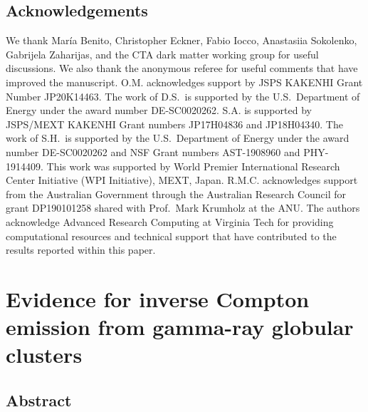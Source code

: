 \documentclass[doublespace,nopageskip]{VTthesis} %
\begin{document}


\section*{Acknowledgements}

We thank Mar\'ia Benito, Christopher Eckner, Fabio Iocco,  Anastasiia Sokolenko, Gabrijela Zaharijas, and the CTA dark matter working group for useful discussions. We also thank the anonymous referee for useful comments that have improved the manuscript. O.M. acknowledges support by JSPS KAKENHI Grant Number JP20K14463.  The work of D.S.\ is supported by the U.S.\ Department of Energy under the award number DE-SC0020262.
S.A. is supported by JSPS/MEXT KAKENHI Grant numbers JP17H04836 and JP18H04340.
The work of S.H.\ is supported by the U.S.\ Department of Energy under the award number DE-SC0020262 and NSF Grant numbers AST-1908960 and PHY-1914409. This work was supported by World Premier International Research Center Initiative (WPI Initiative), MEXT, Japan. R.M.C. acknowledges support from the Australian Government through the Australian Research Council for grant DP190101258 shared with Prof.~Mark Krumholz at the ANU. The authors acknowledge Advanced Research Computing at Virginia Tech for providing computational resources and technical support that have contributed to the results reported within this paper.

\chapter{Evidence for inverse Compton emission from gamma-ray globular clusters} \label{ch:globular_cluster}

\section{Abstract}
\end{document}
